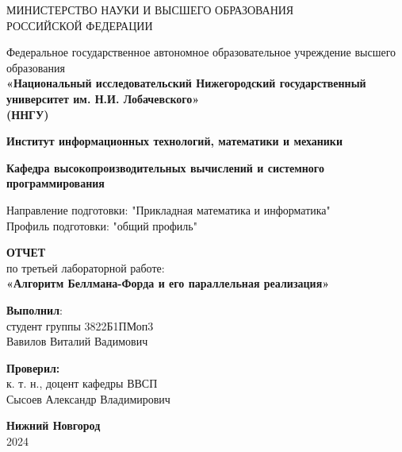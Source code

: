 \documentclass[12pt]{article}
\begin{document}
\begin{titlepage}
\centering
{МИНИСТЕРСТВО НАУКИ И ВЫСШЕГО ОБРАЗОВАНИЯ\\
РОССИЙСКОЙ ФЕДЕРАЦИИ}

\vspace{1em}

Федеральное государственное автономное образовательное учреждение высшего образования\\
\textbf{«Национальный исследовательский Нижегородский государственный университет им. Н.И. Лобачевского»}\\
\textbf{(ННГУ)}

\vspace{2em}

\textbf{Институт информационных технологий, математики и механики}

\vspace{1em}

\textbf{Кафедра высокопроизводительных вычислений и системного программирования}

\vspace{2em}

Направление подготовки: "Прикладная математика и информатика"\\
Профиль подготовки: "общий профиль" \\

\vspace{4em}


\textbf{\Large ОТЧЕТ}\\
по третьей лабораторной работе:\\
\vspace{1em}
\textbf{«Алгоритм Беллмана-Форда и его параллельная реализация»}

\begin{flushright}
\textbf{Выполнил}:\\[5pt]
студент группы {3822Б1ПМоп3} \\[1em]
{Вавилов Виталий Вадимович}
\end{flushright}

\vspace{1em}

\begin{flushright}

\noindent\textbf{Проверил:} \\[5pt]
к. т. н., доцент кафедры ВВСП \\[5pt]
{Сысоев Александр Владимирович}
\end{flushright}

\vspace{1em}

\vfill
\textbf{Нижний Новгород}\\
2024
\end{titlepage}
\end{document}
